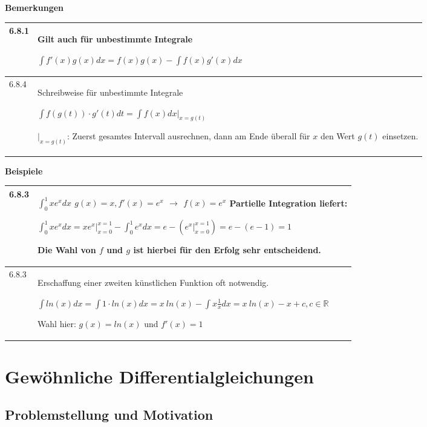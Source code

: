     \noindent
    \textbf{Bemerkungen}
    \begin{table}[H]
    \begin{tabularx}{\textwidth}{X m{16cm}}
        \toprule

        6.8.1 & Gilt auch für unbestimmte Integrale \hfill \break
                \centerline{$ \int f'(x)g(x)dx = f(x) g(x) - \int f(x)g'(x) dx$} \\
        \midrule
        6.8.4 & Schreibweise für unbestimmte Integrale \hfill \break
                \centerline{$ \int f(g(t)) \cdot g'(t) dt = \int f(x) dx \vert_{x=g(t)}$}
                $\vert_{x=g(t)}$: Zuerst gesamtes Intervall ausrechnen, dann am Ende überall für $x$ den Wert $g(t)$ einsetzen. \\   

        \bottomrule
    \end{tabularx}
    \end{table}

    \noindent
    \textbf{Beispiele}
    \begin{table}[H]
    \begin{tabularx}{\textwidth}{X m{16cm}}
        \toprule

        6.8.3 & $\int_0^1 x e^x dx$ \hfill \break
                $g(x) = x, f'(x) = e^x$ $\rightarrow$ $f(x) = e^x$ \hfill \break
                Partielle Integration liefert: \hfill \break
                \centerline{$ \int_0^1 x e^x dx = xe^x \vert_{x=0}^{x=1} - \int_0^1 e^x dx = e- (e^x \vert_{x=0}^{x=1}) =
                e- (e-1) = 1 $} \hfill \break
                Die Wahl von $f$ und $g$ ist hierbei für den Erfolg sehr entscheidend. \\
        \midrule
        6.8.3 & Erschaffung einer zweiten künstlichen Funktion oft notwendig. \hfill \break
                \centerline{$\int ln(x) dx = \int 1 \cdot ln(x) dx= x~ln(x) - \int x\frac{1}{x}dx = x~ln(x) - x + c, c \in \mathbb{R}$}
                Wahl hier: $g(x) = ln(x)$ und $f'(x) = 1$ \\

        \bottomrule
    \end{tabularx}
    \end{table}

    \pagebreak

\section{Gewöhnliche Differentialgleichungen}
\subsection{Problemstellung und Motivation}

